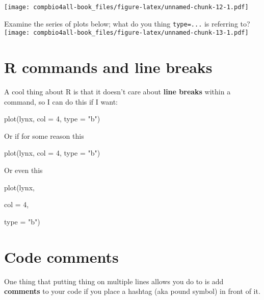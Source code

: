 \documentclass[
]{book}
\newenvironment{Shaded}{\begin{snugshade}}{\end{snugshade}}
\newcommand{\AttributeTok}[1]{\textcolor[rgb]{0.77,0.63,0.00}{#1}}
\newcommand{\DecValTok}[1]{\textcolor[rgb]{0.00,0.00,0.81}{#1}}
\newcommand{\FunctionTok}[1]{\textcolor[rgb]{0.00,0.00,0.00}{#1}}
\newcommand{\NormalTok}[1]{#1}
\newcommand{\StringTok}[1]{\textcolor[rgb]{0.31,0.60,0.02}{#1}}
\begin{document}
\texttt{[image: compbio4all-book\_files/figure-latex/unnamed-chunk-12-1.pdf]}

Examine the series of plots below; what do you thing \texttt{type=...} is referring to?
\texttt{[image: compbio4all-book\_files/figure-latex/unnamed-chunk-13-1.pdf]}

\hypertarget{r-commands-and-line-breaks}{%
\section{R commands and line breaks}\label{r-commands-and-line-breaks}}

A cool thing about R is that it doesn't care about \textbf{line breaks} within a command, so I can do this if I want:

\begin{Shaded}
\begin{Highlighting}[]
\FunctionTok{plot}\NormalTok{(lynx, }
     \AttributeTok{col =} \DecValTok{4}\NormalTok{, }
     \AttributeTok{type =} \StringTok{"b"}\NormalTok{)}
\end{Highlighting}
\end{Shaded}

Or if for some reason this

\begin{Shaded}
\begin{Highlighting}[]
\FunctionTok{plot}\NormalTok{(lynx,  }\AttributeTok{col =} \DecValTok{4}\NormalTok{, }
     \AttributeTok{type =} \StringTok{"b"}\NormalTok{)}
\end{Highlighting}
\end{Shaded}

Or even this

\begin{Shaded}
\begin{Highlighting}[]
\FunctionTok{plot}\NormalTok{(lynx,  }
     
     \AttributeTok{col =} \DecValTok{4}\NormalTok{, }
     
     
     \AttributeTok{type =} \StringTok{"b"}\NormalTok{)}
\end{Highlighting}
\end{Shaded}

\hypertarget{code-comments}{%
\section{Code comments}\label{code-comments}}

One thing that putting thing on multiple lines allows you do to is add \textbf{comments} to your code if you place a hashtag (aka pound symbol) in front of it.
\end{document}
